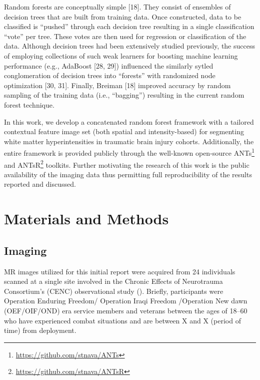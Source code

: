\documentclass[11pt,]{article}
\let\rmarkdownfootnote\footnote%
\def\footnote{\protect\rmarkdownfootnote}
\begin{document}
Random forests are conceptually simple {[}18{]}. They consist of
ensembles of decision trees that are built from training data. Once
constructed, data to be classified is ``pushed'' through each decision
tree resulting in a single classification ``vote'' per tree. These votes
are then used for regression or classification of the data. Although
decision trees had been extensively studied previously, the success of
employing collections of such weak learners for boosting machine
learning performance (e.g., AdaBoost {[}28, 29{]}) influenced the
similarly sytled conglomeration of decision trees into ``forests'' with
randomized node optimization {[}30, 31{]}. Finally, Breiman {[}18{]}
improved accuracy by random sampling of the training data (i.e.,
``bagging'') resulting in the current random forest technique.

In this work, we develop a concatenated random forest framework with a
tailored contextual feature image set (both spatial and intensity-based)
for segmenting white matter hyperintensities in traumatic brain injury
cohorts. Additionally, the entire framework is provided publicly through
the well-known open-source ANTs\footnote{\url{https://github.com/stnava/ANTs}}
and ANTsR\footnote{\url{https://github.com/stnava/ANTsR}} toolkits.
Further motivating the research of this work is the public availability
of the imaging data thus permitting full reproducibility of the results
reported and discussed.

\section{Materials and Methods}\label{materials-and-methods}

\subsection{Imaging}\label{imaging}

MR images utilized for this initial report were acquired from 24
individuals scanned at a single site involved in the Chronic Effects of
Neurotrauma Consortium's (CENC) observational study
().
Briefly, participants were Operation Enduring Freedom/ Operation Iraqi
Freedom /Operation New dawn (OEF/OIF/OND) era service members and
veterans between the ages of 18--60 who have experienced combat
situations and are between X and X (period of time) from deployment.
\end{document}
